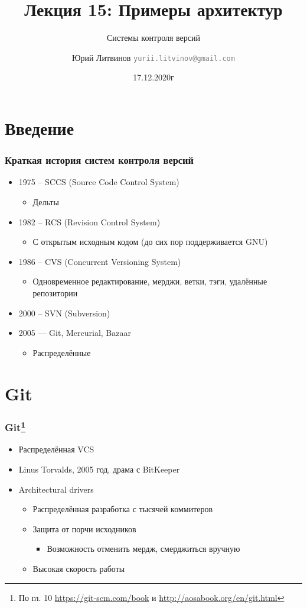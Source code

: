 \documentclass[xetex,mathserif,serif]{beamer}
\title{Лекция 15: Примеры архитектур}
\subtitle{Системы контроля версий}
\author[Юрий Литвинов]{Юрий Литвинов \newline \textcolor{gray}{\small\texttt{yurii.litvinov@gmail.com}}}
\date{17.12.2020г}
\begin{document}
	
	\frame{\titlepage}

	\section{Введение}

	\begin{frame}
		\frametitle{Краткая история систем контроля версий}
		\begin{itemize}
			\item 1975 -- SCCS (Source Code Control System)
			\begin{itemize}
				\item Дельты
			\end{itemize}
			\item 1982 -- RCS (Revision Control System)
			\begin{itemize}
				\item С открытым исходным кодом (до сих пор поддерживается GNU)
			\end{itemize}
			\item 1986 -- CVS (Concurrent Versioning System)
			\begin{itemize}
				\item Одновременное редактирование, мерджи, ветки, тэги, удалённые репозитории
			\end{itemize}
			\item 2000 -- SVN (Subversion)
			\item 2005 --- Git, Mercurial, Bazaar
			\begin{itemize}
				\item Распределённые
			\end{itemize}
		\end{itemize}
	\end{frame}

	\section{Git}

	\begin{frame}
		\frametitle{Git\footnote{\tiny{По гл. 10 \url{https://git-scm.com/book} и \url{http://aosabook.org/en/git.html}}}}
		\begin{itemize}
			\item Распределённая VCS
			\item Linus Torvalds, 2005 год, драма с BitKeeper
			\item Architectural drivers
			\begin{itemize}
				\item Распределённая разработка с тысячей коммитеров
				\item Защита от порчи исходников
				\begin{itemize}
					\item Возможность отменить мердж, смерджиться вручную
				\end{itemize}
				\item Высокая скорость работы
			\end{itemize}
		\end{itemize}
	\end{frame}
\end{document}
